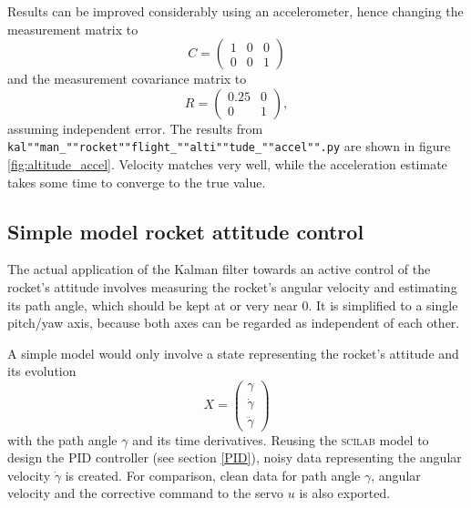 \documentclass[a4paper]{article}
\begin{document}
Results can be improved considerably using an accelerometer, hence changing the measurement matrix to \begin{equation}C=\begin{pmatrix}1 & 0 & 0 \\ 0 & 0 & 1\end{pmatrix}\end{equation} and the measurement covariance matrix to \begin{equation}R=\begin{pmatrix}0.25 & 0 \\ 0 & 1\end{pmatrix},\end{equation} assuming independent error. The results from \texttt{kal""man\_""rocket""flight\_""alti""tude\_""accel"".py} are shown in figure \ref{fig:altitude_accel}. Velocity matches very well, while the acceleration estimate takes some time to converge to the true value.

\subsection{Simple model rocket attitude control}

The actual application of the Kalman filter towards an active control of the rocket's attitude involves measuring the rocket's angular velocity and estimating its path angle, which should be kept at or very near 0. It is simplified to a single pitch/yaw axis, because both axes can be regarded as independent of each other.

A simple model would only involve a state representing the rocket's attitude and its evolution \begin{equation}X=\begin{pmatrix}\gamma \\ \dot{\gamma} \\ \ddot{\gamma} \end{pmatrix}\end{equation} with the path angle $\gamma$ and its time derivatives. Reusing the \textsc{scilab} model to design the PID controller (see section \ref{PID}), noisy data representing the angular velocity $\dot{\gamma}$ is created. For comparison, clean data for path angle $\gamma$, angular velocity and the corrective command to the servo $u$ is also exported.
\end{document}
